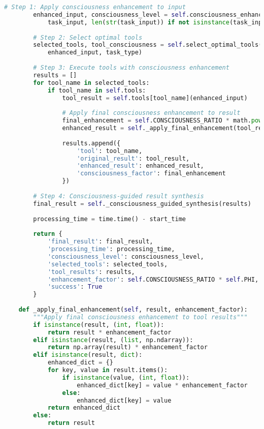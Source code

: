 \documentclass[11pt,a4paper]{article}
\begin{document}
\begin{lstlisting}[language=Python, caption=chAIos Complete Implementation]
        # Step 1: Apply consciousness enhancement to input
        enhanced_input, consciousness_level = self.consciousness_enhancement(
            task_input, len(str(task_input)) if not isinstance(task_input, (list, np.ndarray)) else len(task_input))
        
        # Step 2: Select optimal tools
        selected_tools, tool_consciousness = self.select_optimal_tools(
            enhanced_input, task_type)
        
        # Step 3: Execute tools with consciousness enhancement
        results = []
        for tool_name in selected_tools:
            if tool_name in self.tools:
                tool_result = self.tools[tool_name](enhanced_input)
                
                # Apply final consciousness enhancement to result
                final_enhancement = self.CONSCIOUSNESS_RATIO * math.pow(self.PHI, consciousness_level)
                enhanced_result = self._apply_final_enhancement(tool_result, final_enhancement)
                
                results.append({
                    'tool': tool_name,
                    'original_result': tool_result,
                    'enhanced_result': enhanced_result,
                    'consciousness_factor': final_enhancement
                })
        
        # Step 4: Consciousness-guided result synthesis
        final_result = self._consciousness_guided_synthesis(results)
        
        processing_time = time.time() - start_time
        
        return {
            'final_result': final_result,
            'processing_time': processing_time,
            'consciousness_level': consciousness_level,
            'selected_tools': selected_tools,
            'tool_results': results,
            'enhancement_factor': self.CONSCIOUSNESS_RATIO * self.PHI,
            'success': True
        }
    
    def _apply_final_enhancement(self, result, enhancement_factor):
        """Apply final consciousness enhancement to tool results"""
        if isinstance(result, (int, float)):
            return result * enhancement_factor
        elif isinstance(result, (list, np.ndarray)):
            return np.array(result) * enhancement_factor
        elif isinstance(result, dict):
            enhanced_dict = {}
            for key, value in result.items():
                if isinstance(value, (int, float)):
                    enhanced_dict[key] = value * enhancement_factor
                else:
                    enhanced_dict[key] = value
            return enhanced_dict
        else:
            return result
    

\end{lstlisting}
\end{document}

